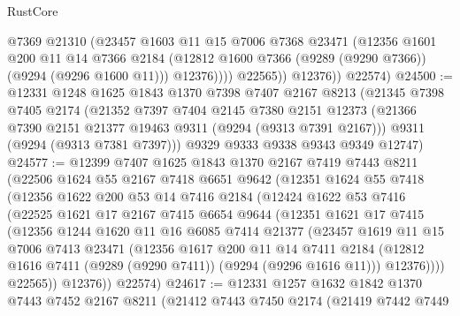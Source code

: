 \begin{lexlean}{RustCore}
\begin{coremodule}
                  @7369
                  @21310
                  (@23457
                    @1603
                    @11
                    @15
                    @7006
                    @7368
                    @23471
                    (@12356
                      @1601
                      @200
                      @11
                      @14
                      @7366
                      @2184
                      (@12812 @1600 @7366 (@9289 (@9290 @7366)) (@9294 (@9296 @1600 @11)))
                      @12376))))
              @22565))
          @12376))
      @22574)
@24500 := @12331
    @1248
    @1625
    @1843
    @1370
    @7398
    @7407
    @2167
    @8213
    (@21345
      @7398
      @7405
      @2174
      (@21352
        @7397
        @7404
        @2145
        @7380
        @2151
        @12373
        (@21366 @7390 @2151 @21377 @19463 @9311 (@9294 (@9313 @7391 @2167)))
        @9311
        (@9294 (@9313 @7381 @7397)))
      @9329
      @9333
      @9338
      @9343
      @9349
      @12747)
@24577 := @12399
    @7407
    @1625
    @1843
    @1370
    @2167
    @7419
    @7443
    @8211
    (@22506
      @1624
      @55
      @2167
      @7418
      @6651
      @9642
      (@12351
        @1624
        @55
        @7418
        (@12356
          @1622
          @200
          @53
          @14
          @7416
          @2184
          (@12424
            @1622
            @53
            @7416
            (@22525
              @1621
              @17
              @2167
              @7415
              @6654
              @9644
              (@12351
                @1621
                @17
                @7415
                (@12356
                  @1244
                  @1620
                  @11
                  @16
                  @6085
                  @7414
                  @21377
                  (@23457
                    @1619
                    @11
                    @15
                    @7006
                    @7413
                    @23471
                    (@12356
                      @1617
                      @200
                      @11
                      @14
                      @7411
                      @2184
                      (@12812 @1616 @7411 (@9289 (@9290 @7411)) (@9294 (@9296 @1616 @11)))
                      @12376))))
              @22565))
          @12376))
      @22574)
@24617 := @12331
    @1257
    @1632
    @1842
    @1370
    @7443
    @7452
    @2167
    @8211
    (@21412
      @7443
      @7450
      @2174
      (@21419
        @7442
        @7449

\end{coremodule}
\end{lexlean}
